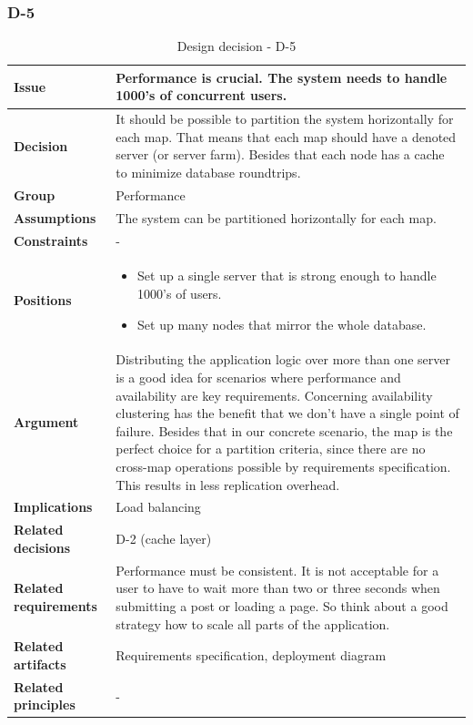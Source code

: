 \documentclass[11pt]{article}
\begin{document}
\newpage

\subsubsection{D-5}

\begin{table}[h] \small
	\begin{tabularx}{\textwidth}{ | l | X |}
    	\hline
	\cellcolor[gray]{0.9}
    	\textbf{Issue} & Performance is crucial. The system needs to handle 1000's of concurrent users. \\
	\hline
	\cellcolor[gray]{0.9}
	\textbf{Decision} & It should be possible to partition the system horizontally for each map. That means that each map should have a denoted server (or server farm). Besides that each node has a cache to minimize database roundtrips. \\ 
	\hline
	\cellcolor[gray]{0.9}
	\textbf{Group} & Performance \\ 
	\hline
	\cellcolor[gray]{0.9}
	\textbf{Assumptions} & The system can be partitioned horizontally for each map. \\ 
	\hline
	\cellcolor[gray]{0.9}
	\textbf{Constraints} & - \\ 
	\hline
	\cellcolor[gray]{0.9}
	\textbf{Positions} & 
		\begin{itemize}
		\item Set up a single server that is strong enough to handle 1000's of users.
		\item Set up many nodes that mirror the whole database.
		\end{itemize}\\ 
	\hline
	\cellcolor[gray]{0.9}
	\textbf{Argument} & Distributing the application logic over more than one server is a good idea for scenarios where performance and availability are key requirements. Concerning availability clustering has the benefit that we don't have a single point of failure. Besides that in our concrete scenario, the map is the perfect choice for a partition criteria, since there are no cross-map operations possible by requirements specification. This results in less replication overhead. \\ 
	\hline
	\cellcolor[gray]{0.9}
	\textbf{Implications} & Load balancing \\ 
	\hline
	\cellcolor[gray]{0.9}
	\textbf{Related decisions} & D-2 (cache layer) \\ 
	\hline
	\cellcolor[gray]{0.9}
	\textbf{Related requirements} & Performance must be consistent. It is not acceptable for a user to have to wait more than two or three seconds when submitting a post or loading a page. So think about a good strategy how to scale all parts of the application.\\
	\hline
	\cellcolor[gray]{0.9}
	\textbf{Related artifacts} & Requirements specification, deployment diagram\\
	\hline
	\cellcolor[gray]{0.9}
	\textbf{Related principles} & -\\
	\hline
	\end{tabularx}
	\caption{Design decision - D-5}
	\label{dec:D5}
\end{table}
\end{document}
